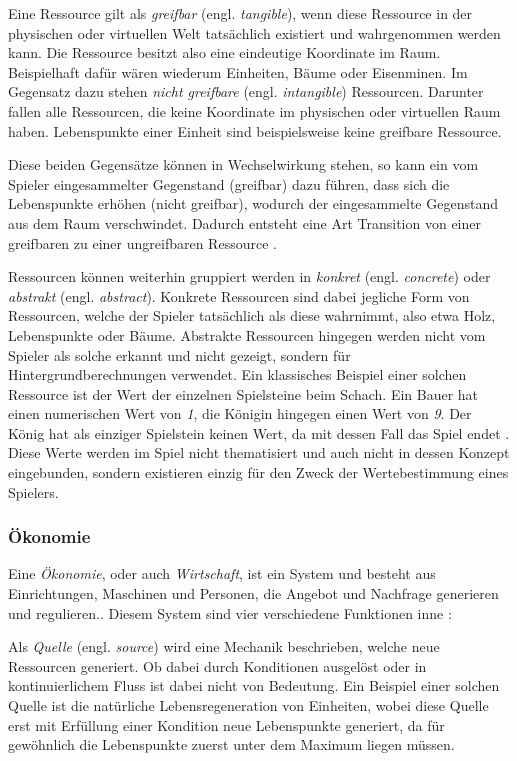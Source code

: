 Eine Ressource gilt als \textit{greifbar} (engl. \textit{tangible}), wenn diese Ressource in der physischen oder virtuellen Welt tatsächlich existiert und wahrgenommen werden kann. Die Ressource besitzt also eine eindeutige Koordinate im Raum. Beispielhaft dafür wären wiederum Einheiten, Bäume oder Eisenminen. Im Gegensatz dazu stehen \textit{nicht greifbare} (engl. \textit{intangible}) Ressourcen. Darunter fallen alle Ressourcen, die keine Koordinate im physischen oder virtuellen Raum haben. Lebenspunkte einer Einheit sind beispielsweise keine greifbare Ressource. 

Diese beiden Gegensätze können in Wechselwirkung stehen, so kann ein vom Spieler eingesammelter Gegenstand (greifbar) dazu führen, dass sich die Lebenspunkte erhöhen (nicht greifbar), wodurch der eingesammelte Gegenstand aus dem Raum verschwindet. Dadurch entsteht eine Art Transition von einer greifbaren zu einer ungreifbaren Ressource \cite*[]{book:gamedesign:resources}. 

Ressourcen können weiterhin gruppiert werden in \textit{konkret} (engl. \textit{concrete}) oder \textit{abstrakt} (engl. \textit{abstract}). Konkrete Ressourcen sind dabei jegliche Form von Ressourcen, welche der Spieler tatsächlich als diese wahrnimmt, also etwa Holz, Lebenspunkte oder Bäume. Abstrakte Ressourcen hingegen werden nicht vom Spieler als solche erkannt und nicht gezeigt, sondern für Hintergrundberechnungen verwendet. Ein klassisches Beispiel einer solchen Ressource ist der Wert der einzelnen Spielsteine beim Schach. Ein Bauer hat einen numerischen Wert von \textit{1}, die Königin hingegen einen Wert von \textit{9}. Der König hat als einziger Spielstein keinen Wert, da mit dessen Fall das Spiel endet \cite*[]{chesspieces}. Diese Werte werden im Spiel nicht thematisiert und auch nicht in dessen Konzept eingebunden, sondern existieren einzig für den Zweck der Wertebestimmung eines Spielers.

\subsubsection{Ökonomie}
Eine \textit{Ökonomie}, oder auch \textit{Wirtschaft}, ist ein System und \glqq [...] besteht aus Einrichtungen, Maschinen und Personen, die Angebot und Nachfrage generieren und regulieren.\grqq \cite*[]{definition:economy}. Diesem System sind vier verschiedene Funktionen inne \cite*[]{book:gamedesign:economy}:

Als \textit{Quelle} (engl. \textit{source}) wird eine Mechanik beschrieben, welche neue Ressourcen generiert. Ob dabei durch Konditionen ausgelöst oder in kontinuierlichem Fluss ist dabei nicht von Bedeutung. Ein Beispiel einer solchen Quelle ist die natürliche Lebensregeneration von Einheiten, wobei diese Quelle erst mit Erfüllung einer Kondition neue Lebenspunkte generiert, da für gewöhnlich die Lebenspunkte zuerst unter dem Maximum liegen müssen.

